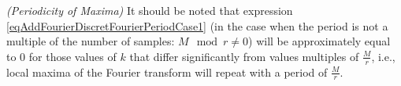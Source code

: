 \begin{remark}
\emph{(Periodicity of Maxima)}
\label{rem:dsp:fourier:periodprop}
It should be noted that expression 
\eqref{eqAddFourierDiscretFourierPeriodCase1} (in the case when
the period is not a multiple of the number of samples: $M \mod r \ne 0$) will be approximately 
equal to 0 for those values of $k$ that differ significantly from values 
multiples of $\frac{M}{r}$, i.e., local maxima of the Fourier transform
will repeat with a period of $\frac{M}{r}$.
\end{remark}